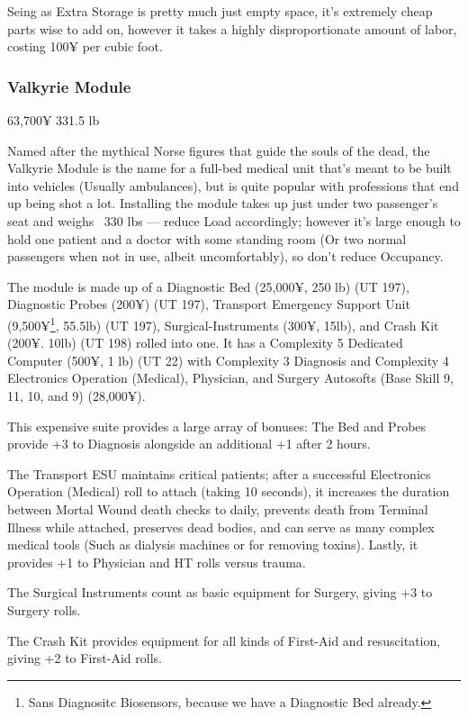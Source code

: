 \begin{multicols*}{2}
	Seing as Extra Storage is pretty much just empty space, it's extremely cheap parts wise to add on, however it takes a highly disproportionate amount of labor, costing 100¥ per cubic foot.
	
	\subsubsection{Valkyrie Module}
	63,700¥ 331.5 lb
	
	Named after the mythical Norse figures that guide the souls of the dead, the Valkyrie Module is the name for a full-bed medical unit that's meant to be built into vehicles (Usually ambulances), but is quite popular with professions that end up being shot a lot. Installing the module takes up just under two passenger's seat and weighs ~330 lbs — reduce Load accordingly; however it's large enough to hold one patient and a doctor with some standing room (Or two normal passengers when not in use, albeit uncomfortably), so don't reduce Occupancy.
	
	The module is made up of a Diagnostic Bed (25,000¥, 250 lb) (UT 197), Diagnostic Probes (200¥) (UT 197), Transport Emergency Support Unit (9,500¥\footnote{Sans Diagnositc Biosensors, because we have a Diagnostic Bed already.}, 55.5lb) (UT 197), Surgical-Instruments (300¥, 15lb), and Crash Kit (200¥. 10lb) (UT 198) rolled into one. It has a Complexity 5 Dedicated Computer (500¥, 1 lb) (UT 22) with Complexity 3 Diagnosis and Complexity 4 Electronics Operation (Medical), Physician, and Surgery Autosofts (Base Skill 9, 11, 10, and 9) (28,000¥). 
	
	This expensive suite provides a large array of bonuses: The Bed and Probes provide +3 to Diagnosis alongside an additional +1 after 2 hours. 
	
	The Transport ESU maintains critical patients; after a successful Electronics Operation (Medical) roll to attach (taking 10 seconds), it increases the duration between Mortal Wound death checks to daily, prevents death from Terminal Illness while attached, preserves dead bodies, and can serve as many complex medical tools (Such as dialysis machines or for removing toxins). Lastly, it provides +1 to Physician and HT rolls versus trauma.
	
	The Surgical Instruments count as basic equipment for Surgery, giving +3 to Surgery rolls.
	
	The Crash Kit provides equipment for all kinds of First-Aid and resuscitation, giving +2 to First-Aid rolls.
	

\end{multicols*}
